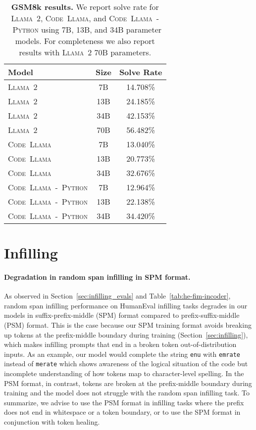 \documentclass[10pt]{article}
\newcommand{\model}{\textsc{Code~Llama}\xspace}
\newcommand{\pymodel}{\textsc{Code~Llama~-~Python}\xspace}
\newcommand{\llamavtwo}{\textsc{Llama~2}\xspace}
\newcommand*{\acc}[1]{\num[round-mode=places,round-precision=1]{#1}\%}
\begin{document}
\begin{table}[t!]
\center
    \setlength{\tabcolsep}{3pt}
    \begin{tabular}{lcc}
    \toprule    
    Model & Size & Solve Rate\\
    \midrule 
    \llamavtwo & 7B & \acc{14.708}\\
    \llamavtwo & 13B & \acc{24.185}\\
    \llamavtwo & 34B & \acc{42.153}\\
    \llamavtwo & 70B & \acc{56.482}\\
    \midrule 
    \model & 7B &  \acc{13.040}\\
    \model & 13B & \acc{20.773}\\
    \model & 34B & \acc{32.676}\\
    \midrule 
    \pymodel & 7B & \acc{12.964}\\
    \pymodel & 13B & \acc{22.138}\\
    \pymodel & 34B & \acc{34.420}\\
    \bottomrule
    \end{tabular}
    \caption{\textbf{GSM8k results.} We report solve rate for \llamavtwo, \model, and \pymodel using 7B, 13B, and 34B parameter models. For completeness we also report results with \llamavtwo 70B parameters.}
    \label{tab:gsm8k}
\end{table}
 \section{Infilling}
\label{app:infilling}
\paragraph{Degradation in random span infilling in SPM format.}
As observed in Section~\ref{sec:infilling_evals} and Table~\ref{tab:he-fim-incoder}, random span infilling performance on HumanEval infilling tasks \citep{bavarian2022efficient} degrades in our models in suffix-prefix-middle (SPM) format compared to prefix-suffix-middle (PSM) format. This is the case because our SPM training format avoids breaking up tokens at the prefix-middle boundary during training (Section~\ref{sec:infilling}), which makes infilling prompts that end in a broken token out-of-distribution inputs. As an example, our model would complete the string \texttt{enu} with \texttt{emrate} instead of \texttt{merate} which shows awareness of the logical situation of the code but incomplete understanding of how tokens map to character-level spelling. In the PSM format, in contrast, tokens are broken at the prefix-middle boundary during training and the model does not struggle with the random span infilling task. To summarize, we advise to use the PSM format in infilling tasks where the prefix does not end in whitespace or a token boundary, or to use the SPM format in conjunction with token healing.
\end{document}
